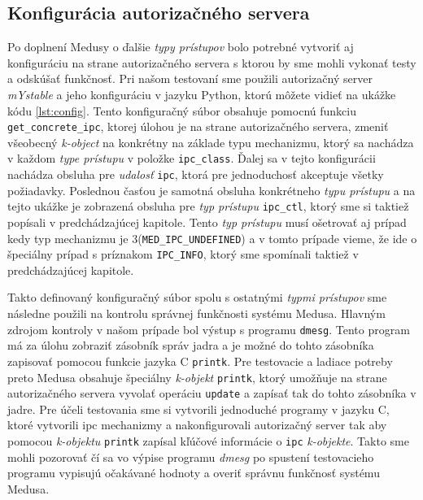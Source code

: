 \subsection{Konfigurácia autorizačného servera}
Po doplnení Medusy o ďalšie \textit{typy prístupov} bolo potrebné vytvoriť aj konfiguráciu na strane autorizačného servera s ktorou by sme mohli vykonať testy a odskúšať funkčnosť. Pri našom testovaní sme použili autorizačný server \textit{mYstable} a jeho konfiguráciu v jazyku Python, ktorú môžete vidieť na ukážke kódu \ref{lst:config}. Tento konfiguračný súbor obsahuje pomocnú funkciu \texttt{get\_concrete\_ipc}, ktorej úlohou je na strane autorizačného servera, zmeniť všeobecný \textit{k-object} na konkrétny na základe typu mechanizmu, ktorý sa nachádza v každom \textit{type prístupu} v položke \texttt{ipc\_class}. Ďalej sa v tejto konfigurácii nachádza obsluha pre \textit{udalosť} \texttt{ipc}, ktorá pre jednoduchosť akceptuje všetky požiadavky. Poslednou časťou je samotná obsluha konkrétneho \textit{typu prístupu} a na tejto ukážke je zobrazená obsluha pre \textit{typ prístupu} \texttt{ipc\_ctl}, ktorý sme si taktiež popísali v predchádzajúcej kapitole. Tento \textit{typ prístupu} musí ošetrovať aj prípad kedy typ mechanizmu je 3(\texttt{MED\_IPC\_UNDEFINED}) a v tomto prípade vieme, že ide o špeciálny prípad s príznakom \texttt{IPC\_INFO}, ktorý sme spomínali taktiež v predchádzajúcej kapitole. 

Takto definovaný konfiguračný súbor spolu s ostatnými \textit{typmi prístupov} sme následne použili na kontrolu správnej funkčnosti systému Medusa. Hlavným zdrojom kontroly v našom prípade bol výstup s programu \texttt{dmesg}. Tento program má za úlohu zobraziť zásobník správ jadra a je možné do tohto zásobníka zapisovať pomocou funkcie jazyka C \texttt{printk}. Pre testovacie a ladiace potreby preto Medusa obsahuje špeciálny \textit{k-objekt} \texttt{printk}, ktorý umožňuje na strane autorizačného servera vyvolať operáciu \texttt{update} a zapísať tak do tohto zásobníka v jadre. Pre účeli testovania sme si vytvorili jednoduché programy v jazyku C, ktoré vytvorili \acrshort{ipc} mechanizmy a nakonfigurovali autorizačný server tak aby pomocou \textit{k-objektu} \texttt{printk} zapísal kľúčové informácie o \texttt{ipc} \textit{k-objekte}. Takto sme mohli pozorovať čí sa vo výpise programu \textit{dmesg} po spustení testovacieho programu vypisujú očakávané hodnoty a overiť správnu funkčnosť systému Medusa.
